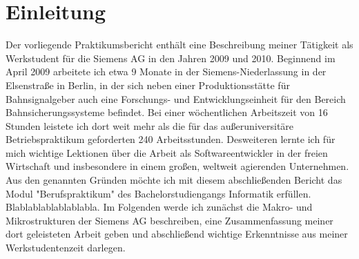 \section*{Einleitung}
Der vorliegende Praktikumsbericht enthält eine Beschreibung meiner Tätigkeit als Werkstudent für die Siemens AG
in den Jahren 2009 und 2010. Beginnend im April 2009 arbeitete ich etwa 9 Monate in der Siemens-Niederlassung in
der Elsenstraße in Berlin, in der sich neben einer Produktionsstätte für Bahnsignalgeber auch eine
Forschungs- und Entwicklungseinheit für den Bereich Bahnsicherungssysteme befindet. Bei einer wöchentlichen Arbeitszeit
von 16 Stunden leistete ich dort weit mehr als die für das außeruniversitäre Betriebspraktikum geforderten 240 Arbeitsstunden. Desweiteren
lernte ich für mich wichtige Lektionen über die Arbeit als Softwareentwickler in der freien Wirtschaft und insbesondere in einem großen, 
weltweit agierenden Unternehmen. Aus den genannten Gründen möchte ich mit diesem abschließenden Bericht das Modul "Berufspraktikum" des 
Bachelorstudiengangs Informatik erfüllen. Blablablablablablabla.
Im Folgenden werde ich zunächst die Makro- und Mikrostrukturen der Siemens AG beschreiben, eine Zusammenfassung meiner dort geleisteten
Arbeit geben und abschließend wichtige Erkenntnisse aus meiner Werkstudentenzeit darlegen.
